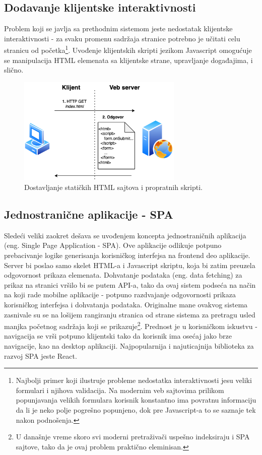 \documentclass[12pt,oneside]{memoir}
\begin{document}
\subsection{Dodavanje klijentske interaktivnosti}

Problem koji se javlja sa prethodnim sistemom jeste nedostatak klijentske interaktivnosti - za svaku promenu sadržaja stranice potrebno je učitati celu stranicu od početka\footnote{Najbolji primer koji ilustruje probleme nedostatka interaktivnosti jesu veliki formulari i njihova validacija. Na modernim veb sajtovima prilikom popunjavanja velikih formulara korisnik konstantno ima povratnu informaciju da li je neko polje pogrešno popunjeno, dok pre Javascript-a to se saznaje tek nakon podnošenja.}. Uvođenje klijentskih skripti jezikom Javascript omogućuje se manipulacija HTML elemenata sa klijentske strane, upravljanje događajima, i slično.

\begin{figure}[h]
  \centering
  \includegraphics[width=0.7\textwidth]{docs/images/ch_4/frontend-dev-phase1.png} 
  \caption{Dostavljanje statičkih HTML sajtova i propratnih skripti.}
  \label{fig:sample}
\end{figure}

\newpage
\subsection{Jednostranične aplikacije - SPA}

Sledeći veliki zaokret dešava se uvođenjem koncepta jednostraničnih aplikacija (eng. Single Page Application - SPA). Ove aplikacije odlikuje potpuno prebacivanje logike generisanja korisničkog interfejsa na frontend deo aplikacije. Server bi poslao samo skelet HTML-a i Javascript skriptu, koja bi zatim preuzela odgovornost prikaza elemenata. Dohvatanje podataka (eng. data fetching) za prikaz na stranici vršilo bi se putem API-a, tako da ovaj sistem podseća na način na koji rade mobilne aplikacije - potpuno razdvajanje odgovornosti prikaza korisničkog interfejsa i dohvatanja podataka. Originalne mane ovakvog sistema zasnivale su se na lošijem rangiranju stranica od strane sistema za pretragu usled manjka početnog sadržaja koji se prikazuje\footnote{U današnje vreme skoro svi moderni pretraživači uspešno indeksiraju i SPA sajtove, tako da je ovaj problem praktično eleminisan.}. Prednost je u korisničkom iskustvu - navigacija se vrši potpuno klijentski tako da korisnik ima osećaj jako brze navigacije, kao na desktop aplikaciji. Najpopularnija i najuticajnija biblioteka za razvoj SPA jeste React.
\end{document}
